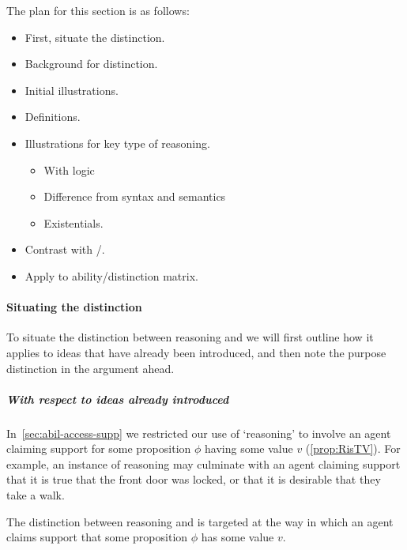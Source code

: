 \begin{note}[Plan]
  The plan for this section is as follows:
  \begin{itemize}
  \item First, situate the distinction.
  \item Background for distinction.
  \item Initial illustrations.
  \item Definitions.
  \item Illustrations for key type of reasoning.
    \begin{itemize}
    \item With logic
    \item Difference from syntax and semantics
    \item Existentials.
    \end{itemize}
  \item Contrast with \dd{}/\dr{}.
  \item Apply to ability/distinction matrix.
  \end{itemize}
\end{note}

\paragraph*{Situating the distinction}

\begin{note}
  To situate the distinction between reasoning \ur{} and \nr{} we will first outline how it applies to ideas that have already been introduced, and then note the purpose distinction in the argument ahead.
\end{note}

\subparagraph*{With respect to ideas already introduced}

\begin{note}
  In~\autoref{sec:abil-access-supp} we restricted our use of `reasoning' to involve an agent claiming support for some proposition \(\phi\) having some value \(v\) (\autoref{prop:RisTV}).
  For example, an instance of reasoning may culminate with an agent claiming support that it is true that the front door was locked, or that it is desirable that they take a walk.

  The distinction between reasoning \ur{} and \nr{} is targeted at the way in which an agent claims support that some proposition \(\phi\) has some value \(v\).
\end{note}

